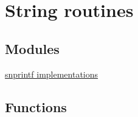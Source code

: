 \hypertarget{group__apr__strings}{}\section{String routines}
\label{group__apr__strings}
\subsection*{Modules}
\begin{DoxyCompactItemize}
\item 
\hyperlink{group___a_p_r___strings___snprintf}{snprintf implementations}
\end{DoxyCompactItemize}
\subsection*{Functions}
